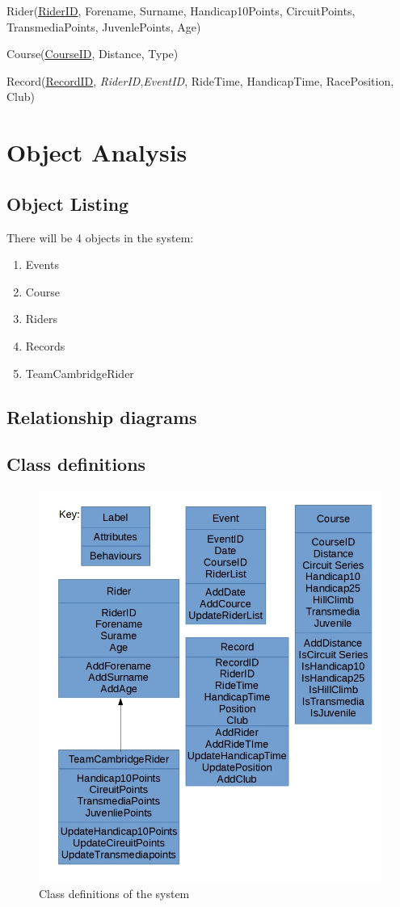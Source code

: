Rider(\underline{RiderID}, Forename, Surname, Handicap10Points, CircuitPoints, TransmediaPoints, JuvenlePoints, Age)

Course(\underline{CourseID}, Distance, Type)

Record(\underline{RecordID}, \emph{RiderID},\emph{EventID}, RideTime, HandicapTime, RacePosition, Club)

\section{Object Analysis}

\subsection{Object Listing}
There will be 4 objects in the system:

\begin{enumerate}
    \item Events
    \item Course
    \item Riders
    \item Records
    \item TeamCambridgeRider
\end{enumerate}
\subsection{Relationship diagrams}

\subsection{Class definitions}
\begin{figure}[H]
	\includegraphics[width=\textwidth]{./Class.jpg}
	\caption{Class definitions of the system}
\end{figure}
